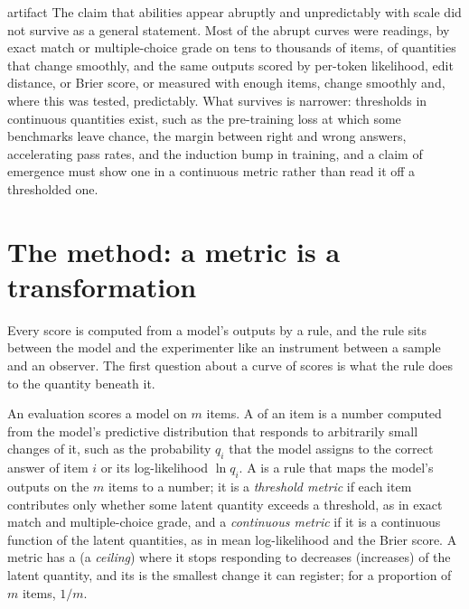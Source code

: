 \begin{refsection}
\begin{verdict}{artifact}
The claim that abilities appear abruptly and unpredictably with scale did not survive as a general statement. Most of the abrupt curves were readings, by exact match or multiple-choice grade on tens to thousands of items, of quantities that change smoothly, and the same outputs scored by per-token likelihood, edit distance, or Brier score, or measured with enough items, change smoothly and, where this was tested, predictably. What survives is narrower: thresholds in continuous quantities exist, such as the pre-training loss at which some benchmarks leave chance, the margin between right and wrong answers, accelerating pass rates, and the induction bump in training, and a claim of emergence must show one in a continuous metric rather than read it off a thresholded one.
\end{verdict}

\section{The method: a metric is a transformation}\label{sec:emergence:metric}

Every score is computed from a model's outputs by a rule, and the rule sits between the model and the experimenter like an instrument between a sample and an observer. The first question about a curve of scores is what the rule does to the quantity beneath it.

\begin{definition}\label{def:emergence:metric}
An evaluation scores a model on $m$ items. A  of an item is a number computed from the model's predictive distribution that responds to arbitrarily small changes of it, such as the probability $q_i$ that the model assigns to the correct answer of item $i$ or its log-likelihood $\ln q_i$. A  is a rule that maps the model's outputs on the $m$ items to a number; it is a \emph{threshold metric} if each item contributes only whether some latent quantity exceeds a threshold, as in exact match and multiple-choice grade, and a \emph{continuous metric} if it is a continuous function of the latent quantities, as in mean log-likelihood and the Brier score. A metric has a  (a \emph{ceiling}) where it stops responding to decreases (increases) of the latent quantity, and its  is the smallest change it can register; for a proportion of $m$ items, $1/m$.
\end{definition}


\end{refsection}
